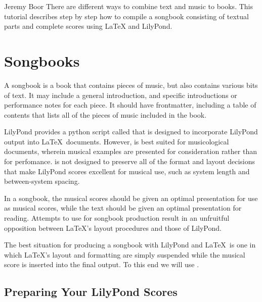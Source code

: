 \documentclass[../../LilyPond-Tutorials]{subfiles}
\begin{document}

\begin{authorAbstract}{Jeremy Boor}
There are different ways to combine text and music to books.
This tutorial describes step by step how to compile a songbook consisting of textual parts and complete scores using \LaTeX{} and LilyPond.
\end{authorAbstract}

\chapter{Songbooks}
A songbook is a book that contains pieces of music, but also contains various bits of text. 
It may include a general introduction, and specific introductions or performance notes for each piece. 
It should have frontmatter, including a table of contents that lists all of the pieces of music included in the book. 

LilyPond provides a python script called   that is designed to incorporate LilyPond output into \LaTeX\ documents. 
However,  is best suited for musicological documents, wherein musical examples are presented for consideration rather than for perfomance. 
 is not designed to preserve all of the format and layout decisions that make LilyPond scores excellent for musical use, such as system length and between-system spacing. 

In a songbook, the musical scores should be given an optimal presentation for use as musical scores, while the text should be given an optimal presentation for reading. 
Attempts to use  for songbook production result in an unfruitful opposition between \LaTeX's layout procedures and those of LilyPond.

The best situation for producing a songbook with LilyPond and \LaTeX\ is one in which \LaTeX's layout and formatting are simply suspended while the musical score is inserted into the final output. 
To this end we will use  .

\section{Preparing Your LilyPond Scores}
\end{document}
